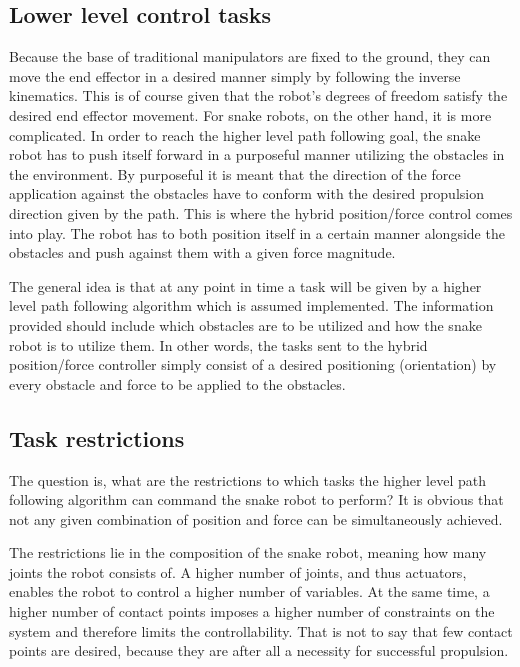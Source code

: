 \subsection{Lower level control tasks}

Because the base of traditional manipulators are fixed to the ground, they can move the end effector in a desired manner simply by following the inverse kinematics. This is of course given that the robot's degrees of freedom satisfy the desired end effector movement. For snake robots, on the other hand, it is more complicated.
In order to reach the higher level path following goal, the snake robot has to push itself forward in a purposeful manner utilizing the obstacles in the environment. By purposeful it is meant that the direction of the force application against the obstacles have to conform with the desired propulsion direction given by the path. This is where the hybrid position/force control comes into play. The robot has to both position itself in a certain manner alongside the obstacles and push against them with a given force magnitude.

The general idea is that at any point in time a task will be given by a higher level path following algorithm which is assumed implemented. The information provided should include which obstacles are to be utilized and how the snake robot is to utilize them. In other words, the tasks sent to the hybrid position/force controller simply consist of a desired positioning (orientation) by every obstacle and force to be applied to the obstacles.



\subsection{Task restrictions}\label{subsec:task-restrictions}

The question is, what are the restrictions to which tasks the higher level path following algorithm can command the snake robot to perform? It is obvious that not any given combination of position and force can be simultaneously achieved.

The restrictions lie in the composition of the snake robot, meaning how many joints the robot consists of. A higher number of joints, and thus actuators, enables the robot to control a higher number of variables. At the same time, a higher number of contact points imposes a higher number of constraints on the system and therefore limits the controllability. That is not to say that few contact points are desired, because they are after all a necessity for successful propulsion.

